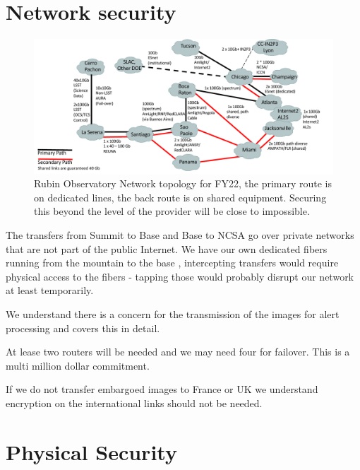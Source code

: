 \section{Network security}\label{sec:net}

\begin{figure}
\begin{center}
\includegraphics[width=1.0\textwidth]{NetworksFY22}
\caption{Rubin Observatory Network topology for FY22, the primary route is on dedicated lines, the back route is on shared equipment. Securing this beyond the level of the provider will be close to impossible.  \label{fig:net}}
\end{center}
\end{figure}


The transfers from Summit to Base and Base to NCSA go over private networks that are not part of the public Internet. We have our own dedicated fibers running from the mountain to the base ,
intercepting transfers would require physical access to the fibers - tapping those would probably disrupt our network at least temporarily.

We understand there is a concern for the transmission of the images for alert processing and
  covers this in detail.

{At lease two routers will be needed and we may need four for failover. This is a multi million dollar commitment. }

If we do not transfer embargoed images to France or UK we understand encryption on the international links should not be needed.



\section {Physical Security}


